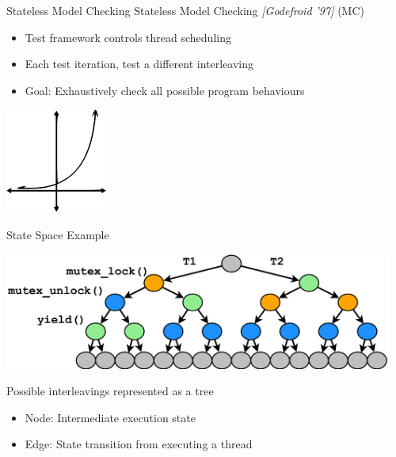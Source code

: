 \documentclass[xcolor=dvipsnames]{beamer}
\begin{document}
\begin{frame}{Stateless Model Checking}
	Stateless Model Checking {\em [Godefroid '97]} (MC)
	\begin{itemize}
		\item Test framework controls thread scheduling
		\item Each test iteration, test a different interleaving
		\item Goal: Exhaustively check all possible program behaviours
	\end{itemize}
	\pause
	\linegap

	\begin{center}
		\includegraphics[width=0.25\textwidth]{../../oopsla/exponential-curve.pdf}
	\end{center}
\end{frame}

\begin{frame}{State Space Example}
	\begin{center}
		\includegraphics[width=0.96\textwidth]{../../oopsla/tree-maximal-only.pdf}
	\end{center}
	\linegap

	Possible interleavings represented as a tree
	\begin{itemize}
		\item Node: Intermediate execution state
		\item Edge: State transition from executing a thread
	\end{itemize}

\end{frame}
\end{document}

